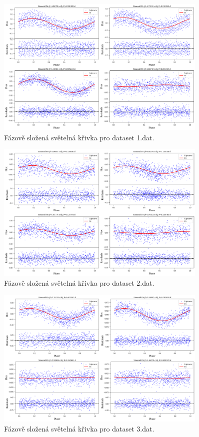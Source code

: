 \documentclass[a4paper,11pt,twocolumn]{article}
\begin{document}
    \begin{figure}
        \centering
        \includegraphics[width=0.9\textwidth]{phase/1_phase_folded.png}
        \caption{Fázově složená světelná křivka pro dataset 1.dat.}
        \label{fig:1_phase_folded}
    \end{figure}

    \begin{figure}
        \centering
        \includegraphics[width=0.9\textwidth]{phase/2_phase_folded.png}
        \caption{Fázově složená světelná křivka pro dataset 2.dat.}
        \label{fig:2_phase_folded}
    \end{figure}

    \begin{figure}
        \centering
        \includegraphics[width=0.9\textwidth]{phase/3_phase_folded.png}
        \caption{Fázově složená světelná křivka pro dataset 3.dat.}
        \label{fig:3_phase_folded}
    \end{figure}
\end{document}
